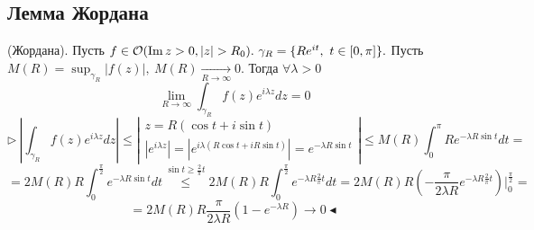 \subsection{Лемма Жордана}
 (Жордана). Пусть $f \in \mathcal{O}(\operatorname{Im} z > 0, |z| > R_0). \ \gamma_R = \{Re^{it}, \ t \in [0, \pi]\}.$ Пусть $M(R) = \sup_{\gamma_R} |f(z)|, \ M(R) \underset{R \to \infty}{\to} 0.$ Тогда $\forall \lambda > 0$
\[\lim_{R \to \infty} \int_{\gamma_R} f(z) e^{i\lambda z}dz=0\]
\[\triangleright \ \left|\int_{\gamma_R} f(z) e^{i\lambda z}dz\right| \leq \left|\begin{array}{ll}
    z = R(\cos t + i\sin t) \\
    \left|e^{i\lambda z}\right| = \left|e^{i\lambda(R\cos t + iR\sin t)}\right| = e^{-\lambda R\sin t}
\end{array}\right| \leq M(R)\int_0^\pi R e^{-\lambda R\sin t} dt =\]
\[=2M(R) R \int_0^{\frac{\pi}{2}} e^{-\lambda R\sin t} dt \overset{\sin t \geq \frac{2}{\pi}t}{\leq}2M(R)R\int_0^{\frac{\pi}{2}} e^{-\lambda R \frac{2}{\pi}t}dt = 2M(R)R \left(-\frac{\pi}{2\lambda R}e^{-\lambda R \frac{2}{\pi}t}\right)\Big|_0^{\frac{\pi}{2}} =\]
\[= 2M(R)R \frac{\pi}{2\lambda R} \left(1-e^{-\lambda R}\right) \to 0 \blacktriangleleft\]